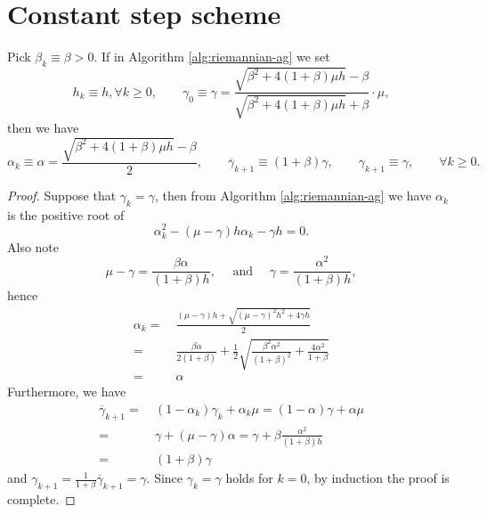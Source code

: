 \appendix

\section{Constant step scheme}
\begin{lemma}\label{thm:constant-step-scheme}
	Pick $\beta_k\equiv \beta > 0$. 
	If in Algorithm \ref{alg:riemannian-ag} we set \[ h_k\equiv h, \forall k\ge 0, \qquad \gamma_0\equiv\gamma = \frac{\sqrt{\beta^2+4(1+\beta)\mu h}-\beta}{\sqrt{\beta^2+4(1+\beta)\mu h}+\beta}\cdot \mu, \]
	then we have 
	\begin{equation}
	\alpha_k\equiv \alpha = \frac{\sqrt{\beta^2+4(1+\beta)\mu h}-\beta}{2}, \qquad \overline{\gamma}_{k+1}\equiv (1+\beta)\gamma, \qquad \gamma_{k+1}\equiv \gamma, \qquad \forall k\ge 0.
	\end{equation}
\end{lemma}
\begin{proof}
	Suppose that $\gamma_k=\gamma$, then from Algorithm \ref{alg:riemannian-ag} we have $\alpha_k$ is the positive root of
	\[ \alpha_k^2-(\mu-\gamma)h\alpha_k - \gamma h = 0. \]
	Also note
	\begin{equation} \label{eq:mu-and-gamma-0}
	\mu - \gamma = \frac{\beta\alpha}{(1+\beta)h}, \text{~~~~and~~~~} \gamma = \frac{\alpha^2}{(1+\beta)h},
	\end{equation}
	hence
	\begin{align*}
	\alpha_k = &~ \frac{(\mu-\gamma)h + \sqrt{(\mu-\gamma)^2h^2 + 4\gamma h}}{2} \\
	= &~ \frac{\beta\alpha}{2(1+\beta)} + \frac{1}{2}\sqrt{\frac{\beta^2\alpha^2}{(1+\beta)^2} + \frac{4\alpha^2}{1+\beta}}  \\
	= &~ \alpha
	\end{align*}
	Furthermore, we have
	\begin{align*}
	\overline{\gamma}_{k+1} = &~ (1-\alpha_k)\gamma_k + \alpha_k\mu = (1-\alpha)\gamma + \alpha\mu \\
	= &~ \gamma + (\mu-\gamma)\alpha = \gamma + \beta\frac{\alpha^2}{(1+\beta)h} \\
	= &~ (1+\beta)\gamma
	\end{align*}
	and $\gamma_{k+1} = \frac{1}{1+\beta}\overline{\gamma}_{k+1} = \gamma$. Since $\gamma_k=\gamma$ holds for $k=0$, by induction the proof is complete.
\end{proof}

